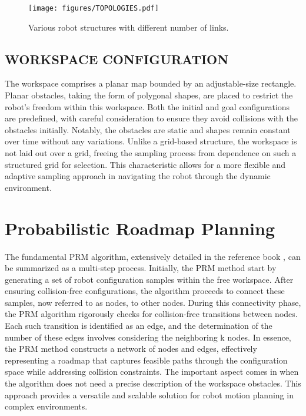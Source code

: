 \documentclass{IEEEtaes}
\begin{document}

\begin{figure}[b]
    \vspace{-2em}
    \begin{center}
        \texttt{[image: figures/TOPOLOGIES.pdf]}
     \end{center}
     \caption{Various robot structures with different number of links.}
     \label{topologies}
\end{figure}

\subsection{{\fontsize{11}{10}\selectfont W}ORKSPACE CONFIGURATION}

The workspace comprises a planar map bounded by an adjustable-size rectangle. Planar obstacles, taking the form of polygonal shapes, are placed to restrict the robot's freedom within this workspace. Both the initial and goal configurations are predefined, with careful consideration to ensure they avoid collisions with the obstacles initially. Notably, the obstacles are static and shapes remain constant over time without any variations. Unlike a grid-based structure, the workspace is not laid out over a grid, freeing the sampling process from dependence on such a structured grid for selection. This characteristic allows for a more flexible and adaptive sampling approach in navigating the robot through the dynamic environment.




\section{\large \textbf{Probabilistic Roadmap Planning}}
The fundamental PRM algorithm, extensively detailed in the reference book \cite{choset}, can be summarized as a multi-step process. Initially, the PRM method start by generating a set of robot configuration samples within the free workspace. After ensuring collision-free configurations, the algorithm proceeds to connect these samples, now referred to as nodes, to other nodes. During this connectivity phase, the PRM algorithm rigorously checks for collision-free transitions between nodes. Each such transition is identified as an edge, and the determination of the number of these edges involves considering the neighboring k nodes. In essence, the PRM method constructs a network of nodes and edges, effectively representing a roadmap that captures feasible paths through the configuration space while addressing collision constraints. The important aspect comes in when the algorithm does not need a precise description of the workspace obstacles. This approach provides a versatile and scalable solution for robot motion planning in complex environments.
\end{document}

